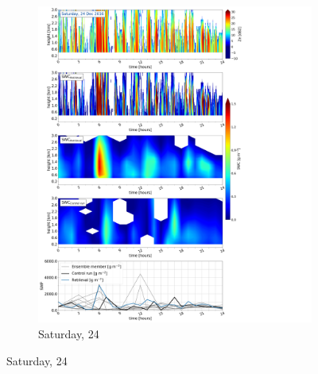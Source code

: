     \begin{figure}\ContinuedFloat
   		\centering
		\begin{subfigure}[b]{0.8\textwidth}
			\includegraphics[trim={0.5cm 0.5cm 17.5cm .5cm},clip,width=\textwidth]{./fig_SWC/20161224}
			\caption{Saturday, \SI{24}{\dec}}\label{fig:SWC24}
		\end{subfigure}
	\end{figure}
